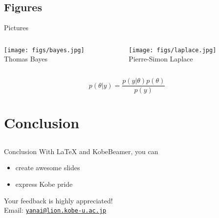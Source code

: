 \documentclass[dvipdfmx]{beamer}
\begin{document}
\subsection{Figures}

{
}


\begin{frame}{Pictures}
  \begin{columns}[t]
    \begin{column}{0.5\textwidth}
     \centering
     \texttt{[image: figs/bayes.jpg]}\\
     Thomas Bayes
   \end{column}
    \begin{column}{0.5\textwidth}
     \centering
     \texttt{[image: figs/laplace.jpg]}\\
     Pierre-Simon Laplace
   \end{column}
 \end{columns}
 \vspace{12pt}
 \[
  p(\theta | y) = \frac{p(y | \theta)p(\theta)}{p(y)}
 \]
\end{frame}


\section{Conclusion}
\subsection{}

\begin{frame}{Conclusion}
 With {\LaTeX} and KobeBeamer, you can
 \begin{itemize}
  \item create awesome slides
  \item express \alert{Kobe pride}
 \end{itemize}
 \pause
 \vspace{36pt}
 Your feedback is highly appreciated!\\
 \hspace{2em} Email: 
 \href{mailto:yanai@lion.kobe-u.ac.jp}{\texttt{yanai@lion.kobe-u.ac.jp}}
 \end{frame}
\end{document}
